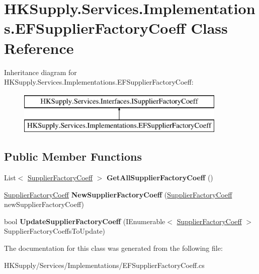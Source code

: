 \hypertarget{class_h_k_supply_1_1_services_1_1_implementations_1_1_e_f_supplier_factory_coeff}{}\section{H\+K\+Supply.\+Services.\+Implementations.\+E\+F\+Supplier\+Factory\+Coeff Class Reference}
\label{class_h_k_supply_1_1_services_1_1_implementations_1_1_e_f_supplier_factory_coeff}
Inheritance diagram for H\+K\+Supply.\+Services.\+Implementations.\+E\+F\+Supplier\+Factory\+Coeff\+:\begin{figure}[H]
\begin{center}
\leavevmode
\includegraphics[height=2.000000cm]{class_h_k_supply_1_1_services_1_1_implementations_1_1_e_f_supplier_factory_coeff}
\end{center}
\end{figure}
\subsection*{Public Member Functions}
\begin{DoxyCompactItemize}
\item 
\mbox{\label{class_h_k_supply_1_1_services_1_1_implementations_1_1_e_f_supplier_factory_coeff_a0af4a4a476051c700029ba142b25631e}} 
List$<$ \mbox{\hyperlink{class_h_k_supply_1_1_models_1_1_supplier_factory_coeff}{Supplier\+Factory\+Coeff}} $>$ {\bfseries Get\+All\+Supplier\+Factory\+Coeff} ()
\item 
\mbox{\label{class_h_k_supply_1_1_services_1_1_implementations_1_1_e_f_supplier_factory_coeff_ac1ce0f280000d9ffb6d941590583ca6c}} 
\mbox{\hyperlink{class_h_k_supply_1_1_models_1_1_supplier_factory_coeff}{Supplier\+Factory\+Coeff}} {\bfseries New\+Supplier\+Factory\+Coeff} (\mbox{\hyperlink{class_h_k_supply_1_1_models_1_1_supplier_factory_coeff}{Supplier\+Factory\+Coeff}} new\+Supplier\+Factory\+Coeff)
\item 
\mbox{\label{class_h_k_supply_1_1_services_1_1_implementations_1_1_e_f_supplier_factory_coeff_ac9387e9c71f905828cf9f7ec45c1cbe0}} 
bool {\bfseries Update\+Supplier\+Factory\+Coeff} (I\+Enumerable$<$ \mbox{\hyperlink{class_h_k_supply_1_1_models_1_1_supplier_factory_coeff}{Supplier\+Factory\+Coeff}} $>$ Supplier\+Factory\+Coeffs\+To\+Update)
\end{DoxyCompactItemize}


The documentation for this class was generated from the following file\+:\begin{DoxyCompactItemize}
\item 
H\+K\+Supply/\+Services/\+Implementations/E\+F\+Supplier\+Factory\+Coeff.\+cs\end{DoxyCompactItemize}
